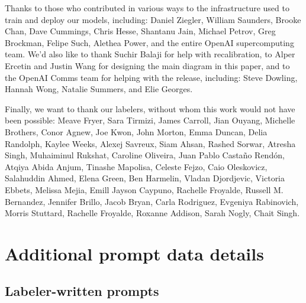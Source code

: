 \documentclass{article}
\begin{document}
Thanks to those who contributed in various ways to the infrastructure used to train and deploy our models, including: Daniel Ziegler, William Saunders, Brooke Chan, Dave Cummings, Chris Hesse, Shantanu Jain, Michael Petrov, Greg Brockman, Felipe Such, Alethea Power, and the entire OpenAI supercomputing team. We'd also like to thank Suchir Balaji for help with recalibration, to Alper Ercetin and Justin Wang for designing the main diagram in this paper, and to the OpenAI Comms team for helping with the release, including: Steve Dowling, Hannah Wong, Natalie Summers, and Elie Georges.

Finally, we want to thank our labelers, without whom this work would not have been possible: Meave Fryer, Sara Tirmizi, James Carroll, Jian Ouyang, Michelle Brothers, Conor Agnew, Joe Kwon, John Morton, Emma Duncan, Delia Randolph, Kaylee Weeks, Alexej Savreux, Siam Ahsan, Rashed Sorwar, Atresha Singh, Muhaiminul Rukshat, Caroline Oliveira, Juan Pablo Casta{\~n}o Rend{\'o}n, Atqiya Abida Anjum, Tinashe Mapolisa,
Celeste Fejzo, Caio Oleskovicz, Salahuddin Ahmed, Elena Green, Ben Harmelin, Vladan Djordjevic, Victoria Ebbets, Melissa Mejia, Emill Jayson Caypuno, Rachelle Froyalde, Russell M. Bernandez, Jennifer Brillo, Jacob Bryan, Carla Rodriguez, Evgeniya Rabinovich, Morris Stuttard, Rachelle Froyalde, Roxanne Addison, Sarah Nogly, Chait Singh.




 


\newpage

\appendix

\section{Additional prompt data details}
\label{apdx:prompt-data}

\subsection{Labeler-written prompts}
\end{document}
